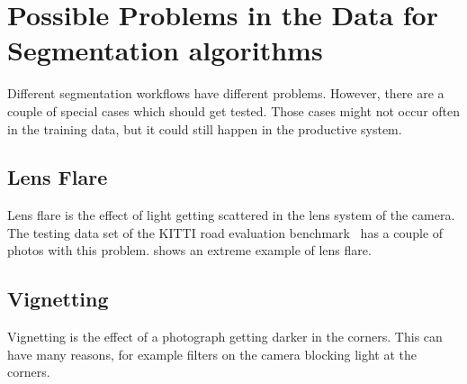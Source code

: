 
\section{Possible Problems in the Data for Segmentation algorithms}%
\label{sec:problems}

Different segmentation workflows have different problems. However, there are
a couple of special cases which should get tested. Those cases might not occur
often in the training data, but it could still happen in the productive system.

\subsection{Lens Flare}
Lens flare is the effect of light getting scattered in the lens system of the
camera. The testing data set of the KITTI road evaluation
benchmark~\cite{Fritsch2013ITSC} has a couple of photos with this problem.
 shows an extreme example of lens flare.


\subsection{Vignetting}
Vignetting is the effect of a photograph getting darker in the corners. This
can have many reasons, for example filters on the camera blocking light at the
corners.



